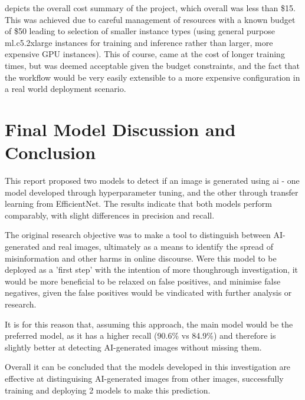  depicts the overall cost summary of the project, which overall was less than \$15. This was achieved due to careful management of resources with a known budget of \$50 leading to selection of smaller instance types (using general purpose ml.c5.2xlarge instances for training and inference rather than larger, more expensive GPU instances). This of course, came at the cost of longer training times, but was deemed acceptable given the budget constraints, and the fact that the workflow would be very easily extensible to a more expensive configuration in a real world deployment scenario.






\newpage

\section{Final Model Discussion and Conclusion}

This report proposed two models to detect if an image is generated using ai - one model developed through hyperparameter tuning, and the other through transfer learning from EfficientNet. The results indicate that both models perform comparably, with slight differences in precision and recall.

The original research objective was to make a tool to distinguish between AI-generated and real images, ultimately as a means to identify the spread of misinformation and other harms in online discourse. Were this model to be deployed as a 'first step' with the intention of more thoughrough investigation, it would be more beneficial to be relaxed on false positives, and minimise false negatives, given the false positives would be vindicated with further analysis or research.

It is for this reason that, assuming this approach, the main model would be the preferred model, as it has a higher recall (90.6\% vs 84.9\%) and therefore is slightly better at detecting AI-generated images without missing them. 




Overall it can be concluded that the models developed in this investigation are effective at distinguising AI-generated images from other images, successfully training and deploying 2 models to make this prediction. 
